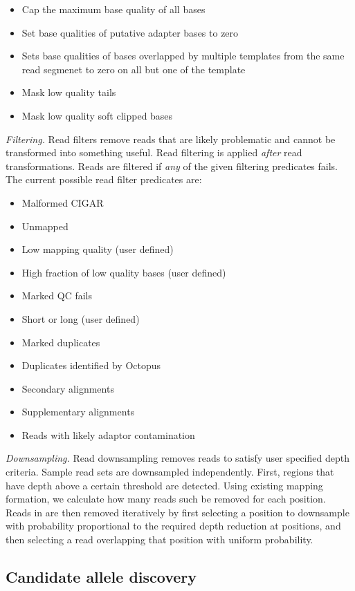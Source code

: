 \documentclass[notitlepage, twocolumn]{article}
\begin{document}
\begin{itemize}
\item Cap the maximum base quality of all bases
\item Set base qualities of putative adapter bases to zero
\item Sets base qualities of bases overlapped by multiple templates from the same read segmenet to zero on all but one of the template
\item Mask low quality tails
\item Mask low quality soft clipped bases
\end{itemize}

\emph{Filtering.} Read filters remove reads that are likely problematic and cannot be transformed into something useful. Read filtering is applied \emph{after} read transformations. Reads are filtered if \emph{any} of the given filtering predicates fails. The current possible read filter predicates are:

\begin{itemize}
\item Malformed CIGAR
\item Unmapped
\item Low mapping quality (user defined)
\item High fraction of low quality bases (user defined)
\item Marked QC fails
\item Short or long (user defined)
\item Marked duplicates
\item Duplicates identified by Octopus
\item Secondary alignments
\item Supplementary alignments
\item Reads with likely adaptor contamination
\end{itemize}

\emph{Downsampling.} Read downsampling removes reads to satisfy user specified depth criteria. Sample read sets are downsampled independently. First, regions that have depth above a certain threshold are detected. Using existing mapping formation, we calculate how many reads such be removed for each position. Reads in  are then removed iteratively by first selecting a position to downsample with probability proportional to the required depth reduction at positions, and then selecting a read overlapping that position with uniform probability.

\subsection*{Candidate allele discovery}
\end{document}
